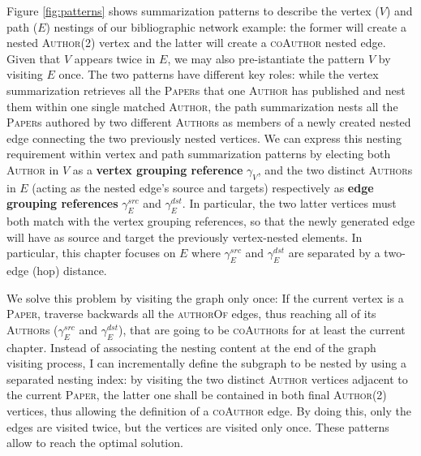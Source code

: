 \begin{example}[label=ex2,continues=ex:nestingbib]
	Figure \ref{fig:patterns} shows summarization patterns to describe the vertex ($V$) and path ($E$) nestings of our bibliographic network example: the former will create a nested \textsc{Author}(2) vertex and the latter will create a \textsc{coAuthor} nested edge. Given that $V$ appears twice in $E$, we may also pre-istantiate the pattern $V$ by visiting $E$ once. The two patterns have different key roles: while the vertex summarization retrieves all the \textsc{Paper}s that one \textsc{Author} has published and nest them within one single matched \textsc{Author}, the path summarization nests all the \textsc{Paper}s authored by two different \textsc{Author}s as members of a newly created nested edge connecting the two previously nested vertices. %
	We can express this nesting requirement within vertex and path summarization patterns by electing both  \textsc{Author} in $V$ as a \textbf{vertex grouping reference} $\gamma_V$, and the two distinct \textsc{Author}s in $E$ (acting as the nested edge's source and targets) respectively as \textbf{edge grouping references} $\gamma_E^{src}$ and $\gamma_E^{dst}$. In particular, the two latter vertices must both match with the vertex grouping references, so that the newly generated edge will have as source and target the previously vertex-nested elements. In particular, this chapter focuses on $E$ where $\gamma_E^{src}$  and $\gamma_E^{dst}$ are separated by a two-edge (hop) distance.
	
	
	We solve this problem by visiting the graph only once: 
	If the current vertex is a \textsc{Paper}, traverse backwards all the \textsc{authorOf} edges, thus reaching all of its \textsc{Author}s ($\gamma_E^{src}$ and $\gamma_E^{dst}$), that are going to be \textsc{coAuthor}s for at least the current chapter. Instead of associating the nesting content at the end of the graph visiting process, I can incrementally define the subgraph to be nested by using a separated nesting index: by visiting the two distinct \textsc{Author} vertices adjacent to the current \textsc{Paper}, the latter one shall be contained in both final \textsc{Author}(2) vertices, thus allowing the definition of a  \textsc{coAuthor} edge. 
	By doing this, only the edges are visited twice, but the vertices are visited only once. These patterns allow to reach the optimal solution.
\end{example}

